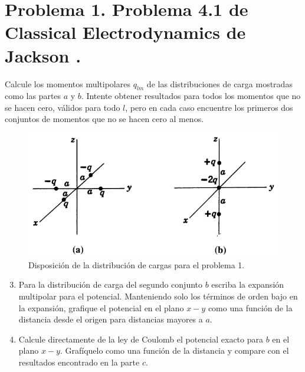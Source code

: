 \documentclass[a4paper,11pt]{article}
\numberwithin{equation}{section}
\renewcommand{\thefootnote}{\fnsymbol{footnote}}
\begin{document}

\fancyhead[R]{\thepage}

\setcounter{footnote}{0}
\renewcommand*{\thefootnote}{\arabic{footnote}}

\section{Problema 1. Problema 4.1 de Classical Electrodynamics
de Jackson \cite{jackson}.}

Calcule los momentos multipolares $q_{lm}$ de las distribuciones de carga mostradas 
como las partes $a$ y $b$. Intente obtener resultados para todos los momentos que 
no se hacen cero, válidos para todo $l$, pero en cada caso encuentre los primeros 
dos conjuntos de momentos que no se hacen cero al menos.

\begin{figure}[H]
 \center 
 \includegraphics[scale = 0.5]{problema1fig1}
 \caption{Disposición de la distribución de cargas para el problema 1.}
\end{figure}

\begin{enumerate}[label=\textbf{(\alph*)}]
\setcounter{enumi}{2}
\item Para la distribución de carga del segundo conjunto $b$ escriba la expansión 
multipolar para el potencial. Manteniendo solo los términos de orden bajo en la 
expansión, grafique el potencial en el plano $x-y$ como una función de la distancia 
desde el origen para distancias mayores a $a$.
\item Calcule directamente de la ley de Coulomb el potencial exacto para $b$ en 
el plano $x-y$. Grafíquelo como una función de la distancia y compare con el resultados
encontrado en la parte $c$.
\end{enumerate}
\end{document}
